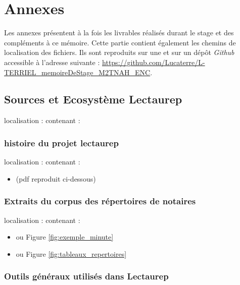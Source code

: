 

\appendix
\part*{Annexes}
\pagestyle{myheadings}

Les annexes présentent à la fois les livrables réalisés durant le stage et des compléments à ce mémoire. Cette partie contient également les chemins de localisation des fichiers. Ils sont reproduits sur une  et sur un dépôt \textit{Github} accessible à l'adresse suivante : \url{https://github.com/Lucaterre/L-TERRIEL_memoireDeStage_M2TNAH_ENC}.
\newpage
\thispagestyle{empty}
\chapter{Sources et Ecosystème Lectaurep}\label{source_lectaurep}

localisation :  contenant :

\section{histoire du projet lectaurep}
localisation :  contenant :
\begin{itemize}
    \item {} (pdf reproduit ci-dessous)
\end{itemize}


\section{Extraits du corpus des répertoires de notaires}
localisation :  contenant :
\begin{itemize}
    \item {} ou Figure  \ref{fig:exemple_minute}
    \item {} ou Figure  \ref{fig:tableaux_repertoires}
\end{itemize}

\section{Outils généraux utilisés dans Lectaurep}

